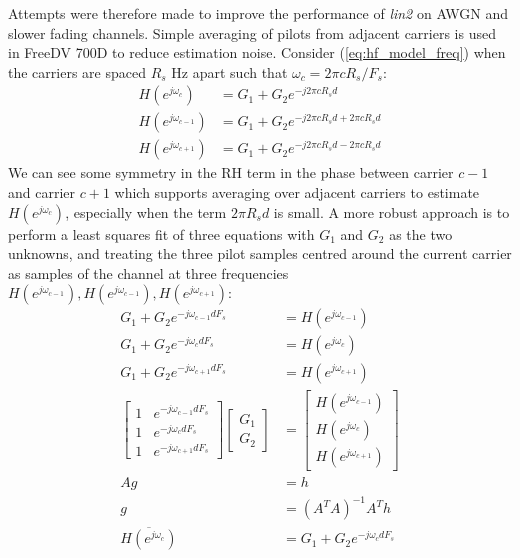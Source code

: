 \documentclass{article}
\begin{document}
Attempts were therefore made to improve the performance of \emph{lin2} on AWGN and slower fading channels.  Simple averaging of pilots from adjacent carriers is used in FreeDV 700D to reduce estimation noise.  Consider (\ref{eq:hf_model_freq}) when the carriers are spaced $R_s$ Hz apart such that $\omega_c = 2 \pi c R_s/F_s$:
\begin{equation}
\begin{split}
H(e^{j \omega_c})      &= G_1 + G_2 e^{-j 2 \pi c R_s d} \\
H(e^{j \omega_{c-1}}) &= G_1 + G_2 e^{-j 2 \pi c R_s d + 2 \pi c R_s d} \\
H(e^{j \omega_{c+1}}) &= G_1 + G_2 e^{-j 2 \pi c R_s d - 2 \pi c R_s d}
\end{split}
\end{equation}
We can see some symmetry in the RH term in the phase between carrier $c-1$ and carrier $c+1$ which supports averaging over adjacent carriers to estimate $H(e^{j \omega_c})$, especially when the term $2 \pi R_s d$ is small.  A more robust approach is to perform a least squares fit \cite{bergada2014digital} of three equations with $G_1$ and $G_2$ as the two unknowns, and treating the three pilot samples centred around the current carrier as samples of the channel at three frequencies $H(e^{j \omega_{c-1}}), H(e^{ j\omega_{c-1}}), H(e^{j\omega_{c+1}})$:
\begin{equation}
\label{eq:combine_freq}
\begin{split}
G_1 + G_2 e^{-j \omega_{c-1} d F_s} &= H(e^{j \omega_{c-1}}) \\
G_1 + G_2 e^{-j \omega_{c}   d F_s} &= H(e^{j \omega_c})      \\
G_1 + G_2 e^{-j \omega_{c+1} d F_s} &= H(e^{j \omega_{c+1}}) \\
\begin{bmatrix}
  1 & e^{-j \omega_{c-1} d F_s} \\
  1 & e^{-j \omega_{c}   d F_s} \\
  1 & e^{-j \omega_{c+1} d F_s}
\end{bmatrix} 
\begin{bmatrix}
  G_1 \\
  G_2
\end{bmatrix} 
&= \begin{bmatrix}
  H(e^{j \omega_{c-1}}) \\
  H(e^{j \omega_c}) \\
  H(e^{j \omega_{c+1}})
\end{bmatrix} \\
Ag &= h \\
 g &= (A^TA)^{-1}A^Th \\
 \overline{H(e^{j \omega_c})} &= G_1 + G_2e^{-j \omega_{c}   d F_s}
\end{split}
\end{equation} 
\end{document}
